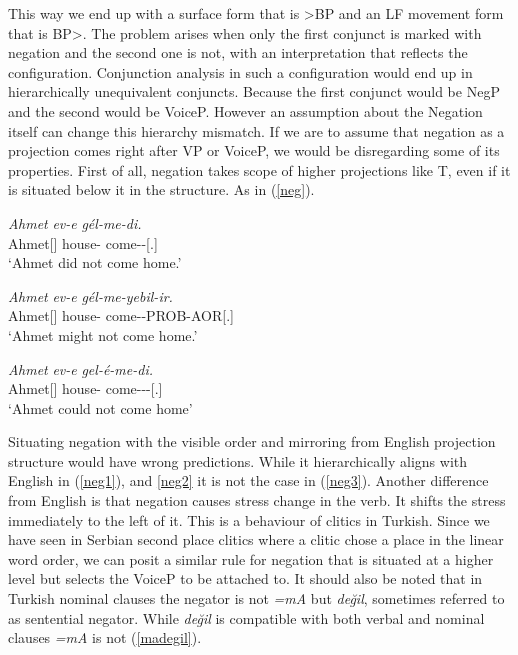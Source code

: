 This way we end up with a surface form that is {\Neg}\textgreater BP and an LF movement form that is BP\textgreater {\Neg}. The problem arises when only the first conjunct is marked with negation and the second one is not, with an interpretation that reflects the configuration. Conjunction analysis in such a configuration would end up in hierarchically unequivalent conjuncts. Because the first conjunct would be NegP and the second would be VoiceP. However an assumption about the Negation itself can change this hierarchy mismatch. If we are to assume that negation as a projection comes right after VP or VoiceP, we would be disregarding some of its properties. First of all, negation takes scope of higher projections like T, even if it is situated below it in the structure. As in (\ref{neg}).

\begin{exe}
    \ex \label{neg}
    \begin{xlist}
        \ex \label{neg1}\gll 
        \textit{Ahmet} \textit{ev-e} \textit{g\'el-me-di.} \\ Ahmet[{\Nom}] house-{\Dat} come-{\Neg}-{\Pst}[{\Third}.{\Sg}] \\
        \glt `Ahmet did not come home.'
        
        \ex \label{neg2}\gll 
        \textit{Ahmet} \textit{ev-e} \textit{g\'el-me-yebil-ir.} \\ Ahmet[{\Nom}] house-{\Dat} come-{\Neg}-PROB-AOR[{\Third}.{\Sg}] \\
        \glt `Ahmet might not come home.'
        
        \ex \label{neg3}\gll 
        \textit{Ahmet} \textit{ev-e} \textit{gel-\'e-me-di.} \\ Ahmet[{\Nom}] house-{\Dat} come-{\Abil}-{\Neg}-{\Pst}[{\Third}.{\Sg}] \\
        \glt `Ahmet could not come home'
    \end{xlist}
\end{exe}

Situating negation with the visible order and mirroring from English projection structure would have wrong predictions. While it hierarchically aligns with English in (\ref{neg1}), and \ref{neg2} it is not the case in (\ref{neg3}). Another difference from English is that negation causes stress change in the verb. It shifts the stress immediately to the left of it. This is a behaviour of clitics in Turkish. Since we have seen in Serbian second place clitics where a clitic chose a place in the linear word order, we can posit a similar rule for negation that is situated at a higher level but selects the VoiceP to be attached to. It should also be noted that in Turkish nominal clauses the negator is not \textit{=mA} but \textit{değil}, sometimes referred to as sentential negator. While \textit{değil} is compatible with both verbal and nominal clauses \textit{=mA} is not (\ref{madegil}).

